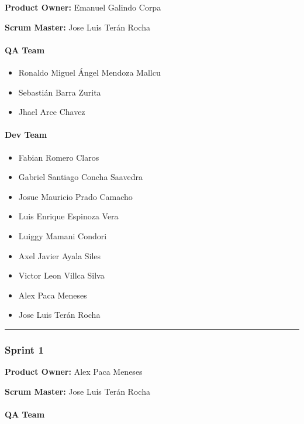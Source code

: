 \textbf{Product Owner:}
Emanuel Galindo Corpa 

\textbf{Scrum Master: }
Jose Luis Terán Rocha

\hypertarget{qateam}{
\paragraph{QA Team}\label{qateam-0}}

\begin{itemize}
\tightlist
\item
  Ronaldo Miguel Ángel Mendoza Mallcu
\item
  Sebastián Barra Zurita
\item
  Jhael Arce Chavez
\end{itemize}

\hypertarget{devteam}{
\paragraph{Dev Team}\label{devteam-0}}

\begin{itemize}
\tightlist
\item
  Fabian Romero Claros
\item
  Gabriel Santiago Concha Saavedra
\item
  Josue Mauricio Prado Camacho
\item
  Luis Enrique Espinoza Vera
\item
  Luiggy Mamani Condori
\item
  Axel Javier Ayala Siles
\item
  Victor Leon Villca Silva
\item
  Alex Paca Meneses
\item
  Jose Luis Terán Rocha
\end{itemize}

\begin{center}\rule{0.5\linewidth}{0.5pt}\end{center}

\hypertarget{sprint1}{
\subsubsection{\texorpdfstring{\textbf{Sprint
1}}{Sprint 1}}\label{sprint1}}

\textbf{Product Owner: }
Alex Paca Meneses

\textbf{Scrum Master: }
Jose Luis Terán Rocha

\hypertarget{qateam-1}{
\paragraph{\texorpdfstring{\textbf{QA Team}}{QA Team}}\label{qateam-1}}

